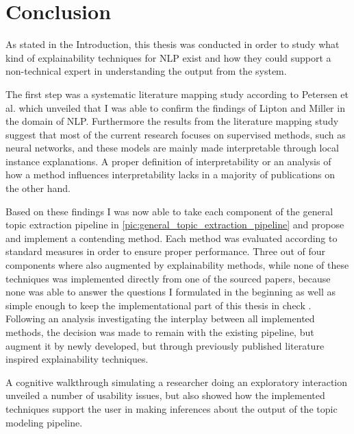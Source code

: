%
\chapter{Conclusion}
\label{chap:conclusion}

As stated in the Introduction, this thesis was conducted in order to study what kind of explainability techniques for NLP exist and how they could support a non-technical expert in understanding the output from the system.

The first step was a systematic literature mapping study according to Petersen et al. \cite{petersenSystematicMappingStudies} which unveiled that I was able to confirm the findings of Lipton \cite{liptonMythosModelInterpretability2016a} and Miller \cite{millerExplanationArtificialIntelligence2017} in the domain of NLP.
Furthermore the results from the literature mapping study suggest that most of the current research focuses on supervised methods, such as neural networks, and these models are mainly made interpretable through local instance explanations. A proper definition of interpretability or an analysis of how a method influences interpretability lacks in a majority of publications on the other hand.

Based on these findings I was now able to take each component of the general topic extraction pipeline in \autoref{pic:general_topic_extraction_pipeline} and propose and implement a contending method. Each method was evaluated according to standard measures in order to ensure proper performance. Three out of four components where also augmented by explainability methods, while none of these techniques was implemented directly from one of the sourced papers, because none was able to answer the questions I formulated in the beginning as well as simple enough to keep the implementational part of this thesis in check .
Following an analysis investigating the interplay between all implemented methods, the decision was made to remain with the existing pipeline, but augment it by newly developed, but through previously published literature inspired explainability techniques.

A cognitive walkthrough simulating a researcher doing an exploratory interaction unveiled a number of usability issues, but also showed how the implemented techniques support the user in making inferences about the output of the topic modeling pipeline.  

